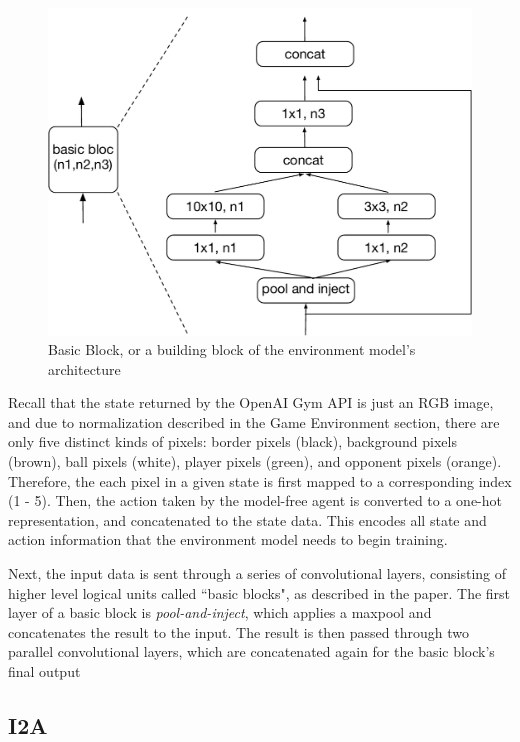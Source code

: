 \documentclass[10pt, twocolumn]{article}
\begin{document}
\begin{figure}[H]
\centering
\includegraphics[scale=0.3]{basic_layer}
\caption{Basic Block, or a building block of the environment model's architecture}
\end{figure}

Recall that the state returned by the OpenAI Gym API is just an RGB image, and due to normalization 
described in the Game Environment section, there are only five distinct kinds of pixels: border pixels (black),
background pixels (brown), ball pixels (white), player pixels (green), and opponent pixels (orange).
Therefore, the each pixel in a given state is first mapped to a corresponding index (1 - 5). Then, the action
taken by the model-free agent is converted to a one-hot representation, and concatenated to the
state data. This encodes all state and action information that the environment model needs to begin training.

Next, the input data is sent through a series of convolutional layers, consisting of higher level logical units
called ``basic blocks", as described in the paper. The first layer of a basic block is \emph{pool-and-inject},
which applies a maxpool and concatenates the result to the input. The result is then passed through
two parallel convolutional layers, which are concatenated again for the basic block's final output



\subsection{I2A}
\end{document}
